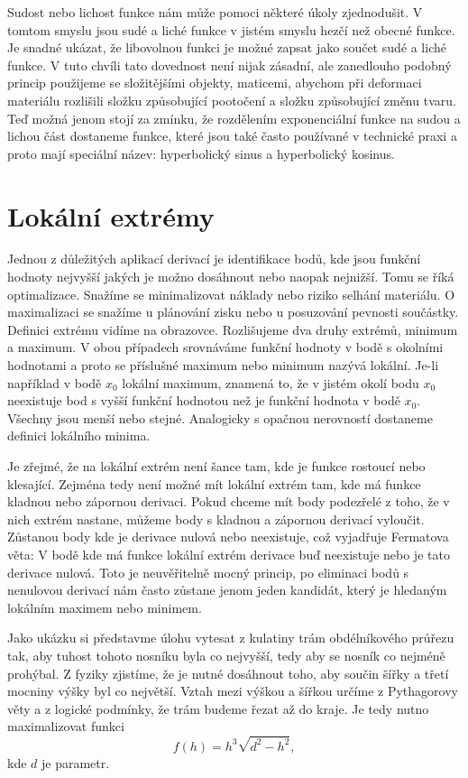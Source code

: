 \documentclass[12pt]{article}
\begin{document}
Sudost nebo lichost funkce nám může pomoci některé úkoly zjednodušit. V tomtom smyslu jsou sudé a liché funkce v jistém smyslu hezčí než obecné funkce. Je snadné ukázat, že libovolnou funkci je možné zapsat jako součet sudé a liché funkce. V tuto chvíli tato dovednost není nijak zásadní, ale zanedlouho podobný princip použijeme se složitějšími objekty, maticemi, abychom při deformaci materiálu rozlišili složku způsobující pootočení a složku způsobující změnu tvaru. Teď možná jenom stojí za zmínku, že rozdělením exponenciální funkce na sudou a lichou část dostaneme funkce, které jsou také často používané v technické praxi a proto mají speciální název: hyperbolický sinus a hyperbolický kosinus. 

\section*{Lokální extrémy}

Jednou z důležitých aplikací derivací je identifikace bodů, kde jsou funkční hodnoty nejvyšší jakých je možno dosáhnout nebo naopak nejnižší. Tomu se říká optimalizace. Snažíme se minimalizovat náklady nebo riziko selhání materiálu. O maximalizaci se snažíme u plánování zisku nebo u posuzování pevnosti součástky. Definici extrému vidíme na obrazovce. Rozlišujeme dva druhy extrémů, minimum a maximum. V obou případech srovnáváme funkční hodnoty v bodě s okolními hodnotami a proto se příslušné maximum nebo minimum nazývá lokální. Je-li například v bodě $x_0$ lokální maximum, znamená to, že v jistém okolí bodu $x_0$ neexistuje bod s vyšší funkční hodnotou než je funkční hodnota v bodě $x_0$. Všechny jsou menší nebo stejné. Analogicky s opačnou nerovností dostaneme definici lokálního minima.

Je zřejmé, že na lokální extrém není šance tam, kde je funkce rostoucí nebo klesající. Zejména tedy není možné mít lokální extrém tam, kde má funkce kladnou nebo zápornou derivaci. Pokud chceme mít body podezřelé z toho, že v nich extrém nastane, můžeme body s kladnou a zápornou derivací vyloučit. Zůstanou body kde je derivace nulová nebo neexistuje, což vyjadřuje Fermatova věta: V bodě kde má funkce lokální extrém derivace buď neexistuje nebo je tato derivace nulová. Toto je neuvěřitelně mocný princip, po eliminaci bodů s nenulovou derivací nám často zůstane jenom jeden kandidát, který je hledaným lokálním maximem nebo minimem.

Jako ukázku si představme úlohu vytesat z kulatiny trám obdélníkového průřezu tak, aby tuhost tohoto nosníku byla co nejvyšší, tedy aby se nosník co nejméně prohýbal. Z fyziky zjistíme, že je nutné dosáhnout toho, aby součin šířky a třetí mocniny výšky byl co největší. Vztah mezi výškou a šířkou určíme z Pythagorovy věty a z logické podmínky, že trám budeme řezat až do kraje. Je tedy nutno maximalizovat funkci
$$f(h)=h^3\sqrt{d^2-h^2},$$
kde $d$ je parametr.
\end{document}
